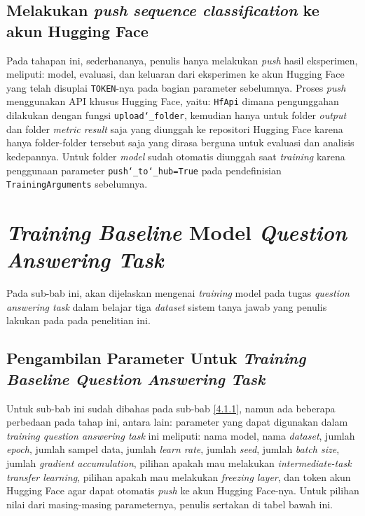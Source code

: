 \subsection{Melakukan \emph{push} \emph{sequence classification} ke akun Hugging Face}
\label{4.1.11}
Pada tahapan ini, sederhananya, penulis hanya melakukan \emph{push} hasil eksperimen, meliputi: model, evaluasi, dan keluaran dari eksperimen ke akun Hugging Face yang telah disuplai \texttt{TOKEN}-nya pada bagian parameter sebelumnya. Proses \emph{push} menggunakan API khusus Hugging Face, yaitu: \texttt{HfApi} dimana pengunggahan dilakukan dengan fungsi \texttt{upload\char`_folder}, kemudian hanya untuk folder \emph{output} dan folder \emph{metric result} saja yang diunggah ke repositori Hugging Face karena hanya folder-folder tersebut saja yang dirasa berguna untuk evaluasi dan analisis kedepannya. Untuk folder \emph{model} sudah otomatis diunggah saat \emph{training} karena penggunaan parameter \texttt{push\char`_to\char`_hub=True} pada pendefinisian \texttt{TrainingArguments} sebelumnya.

\section{\emph{Training} \emph{Baseline} Model \emph{Question Answering Task}}
\label{4.2}
Pada sub-bab ini, akan dijelaskan mengenai \emph{training} model pada tugas \emph{question answering task} dalam belajar tiga \emph{dataset} sistem tanya jawab yang penulis lakukan pada pada penelitian ini.

\subsection{Pengambilan Parameter Untuk \emph{Training Baseline Question Answering Task}}
\label{4.2.1}
Untuk sub-bab ini sudah dibahas pada sub-bab \ref{4.1.1}, namun ada beberapa perbedaan pada tahap ini, antara lain: parameter yang dapat digunakan dalam \emph{training question answering task} ini meliputi: nama model, nama \emph{dataset}, jumlah \emph{epoch}, jumlah sampel data, jumlah \emph{learn rate}, jumlah \emph{seed}, jumlah \emph{batch size}, jumlah \emph{gradient accumulation}, pilihan apakah mau melakukan \emph{intermediate-task transfer learning}, pilihan apakah mau melakukan \emph{freezing layer}, dan token akun Hugging Face agar dapat otomatis \emph{push} ke akun Hugging Face-nya. Untuk pilihan nilai dari masing-masing parameternya, penulis sertakan di tabel bawah ini.


